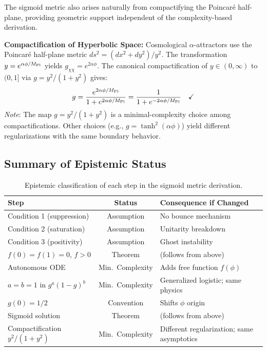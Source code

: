\documentclass[11pt,a4paper]{article}
\begin{document}
The sigmoid metric also arises naturally from compactifying the Poincar\'e half-plane, providing geometric support independent of the complexity-based derivation.

\begin{theorem_box}
\textbf{Compactification of Hyperbolic Space:} Cosmological $\alpha$-attractors \cite{Kallosh2013,Carrasco2015} use the Poincar\'e half-plane metric $ds^2 = (dx^2 + dy^2)/y^2$. The transformation $y = e^{\alpha\phi/M_{\rm Pl}}$ yields $g_{\chi\chi} = e^{2\alpha\phi}$. The canonical compactification of $y \in (0,\infty)$ to $(0,1]$ via $g = y^2/(1+y^2)$ gives:
\begin{equation}
g = \frac{e^{2\alpha\phi/M_{\rm Pl}}}{1 + e^{2\alpha\phi/M_{\rm Pl}}} = \frac{1}{1 + e^{-2\alpha\phi/M_{\rm Pl}}} \quad \checkmark
\end{equation}
\textit{Note}: The map $g = y^2/(1+y^2)$ is a minimal-complexity choice among compactifications. Other choices (e.g., $g = \tanh^2(\alpha\phi)$) yield different regularizations with the same boundary behavior.
\end{theorem_box}

\subsection{Summary of Epistemic Status}
\label{sec:epistemic_summary}

\begin{table}[htbp]
\centering
\begin{tabular}{lcl}
\toprule
\textbf{Step} & \textbf{Status} & \textbf{Consequence if Changed} \\
\midrule
Condition 1 (suppression) & Assumption & No bounce mechanism \\
Condition 2 (saturation) & Assumption & Unitarity breakdown \\
Condition 3 (positivity) & Assumption & Ghost instability \\
$f(0)=f(1)=0$, $f>0$ & Theorem & (follows from above) \\
Autonomous ODE & Min.\ Complexity & Adds free function $f(\phi)$ \\
$a=b=1$ in $g^a(1-g)^b$ & Min.\ Complexity & Generalized logistic; same physics \\
$g(0)=1/2$ & Convention & Shifts $\phi$ origin \\
Sigmoid solution & Theorem & (follows from above) \\
Compactification $y^2/(1+y^2)$ & Min.\ Complexity & Different regularization; same asymptotics \\
\bottomrule
\end{tabular}
\caption{Epistemic classification of each step in the sigmoid metric derivation.}
\label{tab:epistemic}
\end{table}
\end{document}
